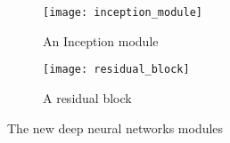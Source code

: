 \documentclass[../main.tex]{subfiles}
\begin{document}
\begin{description}
\begin{figure}[!hb]
   \centering
    \begin{subfigure}{0.4\linewidth}
        \texttt{[image: inception\_module]}
        \caption{An Inception module} \cite{Szegedy2015}
    \end{subfigure}
    \begin{subfigure}{0.4\linewidth}
        \texttt{[image: residual\_block]}
        \caption{A residual block} \cite{Wu2017}
    \end{subfigure}
   
  \caption{The new deep neural networks modules}
  \label{fig:blocks}
\end{figure}

\end{description}
\end{document}
